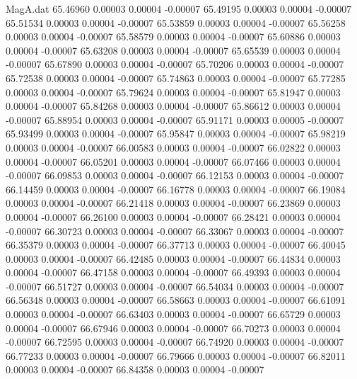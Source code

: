\begin{filecontents}{MagA.dat}
  65.46960    0.00003    0.00004   -0.00007
  65.49195    0.00003    0.00004   -0.00007
  65.51534    0.00003    0.00004   -0.00007
  65.53859    0.00003    0.00004   -0.00007
  65.56258    0.00003    0.00004   -0.00007
  65.58579    0.00003    0.00004   -0.00007
  65.60886    0.00003    0.00004   -0.00007
  65.63208    0.00003    0.00004   -0.00007
  65.65539    0.00003    0.00004   -0.00007
  65.67890    0.00003    0.00004   -0.00007
  65.70206    0.00003    0.00004   -0.00007
  65.72538    0.00003    0.00004   -0.00007
  65.74863    0.00003    0.00004   -0.00007
  65.77285    0.00003    0.00004   -0.00007
  65.79624    0.00003    0.00004   -0.00007
  65.81947    0.00003    0.00004   -0.00007
  65.84268    0.00003    0.00004   -0.00007
  65.86612    0.00003    0.00004   -0.00007
  65.88954    0.00003    0.00004   -0.00007
  65.91171    0.00003    0.00005   -0.00007
  65.93499    0.00003    0.00004   -0.00007
  65.95847    0.00003    0.00004   -0.00007
  65.98219    0.00003    0.00004   -0.00007
  66.00583    0.00003    0.00004   -0.00007
  66.02822    0.00003    0.00004   -0.00007
  66.05201    0.00003    0.00004   -0.00007
  66.07466    0.00003    0.00004   -0.00007
  66.09853    0.00003    0.00004   -0.00007
  66.12153    0.00003    0.00004   -0.00007
  66.14459    0.00003    0.00004   -0.00007
  66.16778    0.00003    0.00004   -0.00007
  66.19084    0.00003    0.00004   -0.00007
  66.21418    0.00003    0.00004   -0.00007
  66.23869    0.00003    0.00004   -0.00007
  66.26100    0.00003    0.00004   -0.00007
  66.28421    0.00003    0.00004   -0.00007
  66.30723    0.00003    0.00004   -0.00007
  66.33067    0.00003    0.00004   -0.00007
  66.35379    0.00003    0.00004   -0.00007
  66.37713    0.00003    0.00004   -0.00007
  66.40045    0.00003    0.00004   -0.00007
  66.42485    0.00003    0.00004   -0.00007
  66.44834    0.00003    0.00004   -0.00007
  66.47158    0.00003    0.00004   -0.00007
  66.49393    0.00003    0.00004   -0.00007
  66.51727    0.00003    0.00004   -0.00007
  66.54034    0.00003    0.00004   -0.00007
  66.56348    0.00003    0.00004   -0.00007
  66.58663    0.00003    0.00004   -0.00007
  66.61091    0.00003    0.00004   -0.00007
  66.63403    0.00003    0.00004   -0.00007
  66.65729    0.00003    0.00004   -0.00007
  66.67946    0.00003    0.00004   -0.00007
  66.70273    0.00003    0.00004   -0.00007
  66.72595    0.00003    0.00004   -0.00007
  66.74920    0.00003    0.00004   -0.00007
  66.77233    0.00003    0.00004   -0.00007
  66.79666    0.00003    0.00004   -0.00007
  66.82011    0.00003    0.00004   -0.00007
  66.84358    0.00003    0.00004   -0.00007

\end{filecontents}
